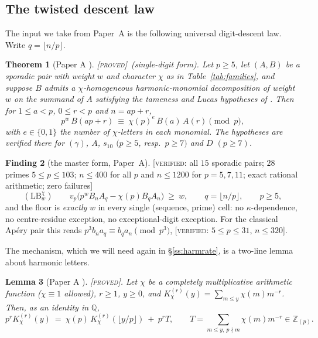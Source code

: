 \documentclass[11pt,reqno]{article}
\newcommand{\QQ}{\mathbb{Q}}
\newcommand{\ZZ}{\mathbb{Z}}
\newcommand{\vp}{v_p}
\newcommand{\floor}[1]{\lfloor #1 \rfloor}
\newcommand{\PROVED}{{\normalfont\textsc{[proved]}}}
\newcommand{\VER}[1]{{\normalfont\textsc{[verified:} #1\textsc{]}}}
\theoremstyle{plain}
\newtheorem{theorem}{Theorem}[section]
\newtheorem{lemma}[theorem]{Lemma}
\theoremstyle{definition}
\newtheorem{finding}[theorem]{Finding}
\theoremstyle{remark}
\numberwithin{equation}{section}
\begin{document}
\subsection{The twisted descent law}\label{ss:LB}

The input we take from Paper~A \cite{PaperA-inprep} is the following universal
digit-descent law.  Write $q=\floor{n/p}$.

\begin{theorem}[{Paper A \cite{PaperA-inprep}}]\label{thm:LB}
\PROVED\ (single-digit form).  Let $p\ge5$, let $(A,B)$ be a sporadic pair with
weight $w$ and character $\chi$ as in Table~\ref{tab:families}, and suppose $B$
admits a $\chi$-homogeneous harmonic-monomial decomposition of weight $w$ on the
summand of $A$ satisfying the tameness and Lucas hypotheses of
\cite{PaperA-inprep}.  Then for $1\le a<p$, $0\le r<p$ and $n=ap+r$,
\[
  p^{w}\,B(ap+r)\ \equiv\ \chi(p)^{e}\,B(a)\,A(r)\pmod p ,
\]
with $e\in\{0,1\}$ the number of $\chi$-letters in each monomial.  The
hypotheses are verified there for $(\gamma)$, $A$, $s_{10}$ $(p\ge5$, resp.\
$p\ge7)$ and $D$ $(p\ge7)$.
\end{theorem}

\begin{finding}[{the master form, Paper~A}]\label{find:master}
\VER{all $15$ sporadic pairs; $28$ primes $5\le p\le103$; $n\le400$ for all $p$
and $n\le1200$ for $p=5,7,11$; exact rational arithmetic; zero failures}
\[
  (\mathrm{LB}_w^\chi)\qquad
  \vp\bigl(p^{w}B_nA_q-\chi(p)B_qA_n\bigr)\ \ge\ w,
  \qquad q=\floor{n/p},\qquad p\ge5,
\]
and the floor is \emph{exactly} $w$ in every single (sequence, prime) cell: no
$\kappa$-dependence, no centre-residue exception, no exceptional-digit
exception.  For the classical Ap\'ery pair this reads $p^3b_na_q\equiv b_qa_n
\pmod{p^3}$, \VER{$5\le p\le31$, $n\le320$}.
\end{finding}

The mechanism, which we will need again in \S\ref{ss:harmrate}, is a two-line
lemma about harmonic letters.

\begin{lemma}[{Paper A \cite{PaperA-inprep}}]\label{lem:K}
\PROVED.  Let $\chi$ be a completely multiplicative arithmetic function
($\chi\equiv1$ allowed), $r\ge1$, $y\ge0$, and
$K^{(r)}_\chi(y)=\sum_{m\le y}\chi(m)m^{-r}$.  Then, as an identity in $\QQ$,
\[
  p^{r}K^{(r)}_\chi(y)\ =\ \chi(p)\,K^{(r)}_\chi(\floor{y/p})\ +\ p^{r}T,
  \qquad T=\!\!\sum_{m\le y,\ p\nmid m}\!\!\chi(m)m^{-r}\in\ZZ_{(p)} .
\]
\end{lemma}
\end{document}
